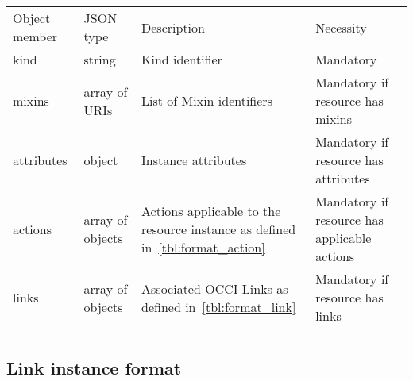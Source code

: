 \documentclass[10pt,a4paper]{article}
\begin{document}
 {
    \begin{tabular}{llp{5.0cm}p{3.0cm}}
    \toprule
    Object member & JSON type & Description & Necessity \\
    \colrule
    kind & string & Kind identifier & Mandatory \\

    mixins & array of URIs & List of Mixin identifiers &
    Mandatory if resource has mixins \\

    attributes & object & Instance attributes & Mandatory if resource has attributes \\

    actions & array of objects & Actions applicable to the resource instance as defined in~\ref{tbl:format_action} &
    Mandatory if resource has applicable actions \\
    
    links & array of objects & Associated OCCI Links as defined in~\ref{tbl:format_link} &
    Mandatory if resource has links\\
    \botrule
    \end{tabular}
}

\subsection{Link instance format}
\label{sec:format_link}
\end{document}
